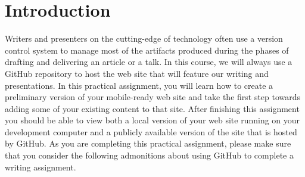 

\usepackage[compact]{titlesec}



\vspace*{-.2in}
\section*{Introduction}

Writers and presenters on the cutting-edge of technology often use a version control system to manage most of the
artifacts produced during the phases of drafting and delivering an article or a talk. In this course, we will always use
a GitHub repository to host the web site that will feature our writing and presentations. In this practical assignment,
you will learn how to create a preliminary version of your mobile-ready web site and take the first step towards adding
some of your existing content to that site. After finishing this assignment you should be able to view both a local
version of your web site running on your development computer and a publicly available version of the site that is
hosted by GitHub. As you are completing this practical assignment, please make sure that you consider the following
admonitions about using GitHub to complete a writing assignment.

